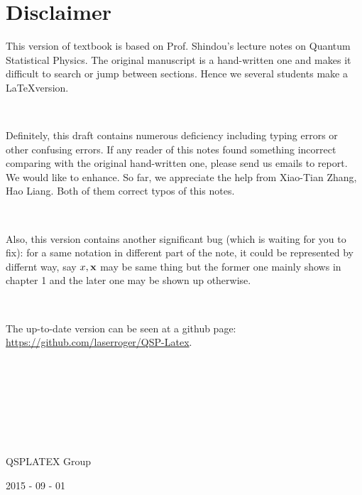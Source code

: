 
\chapter*{Disclaimer}

This version of textbook is based on Prof. Shindou's lecture notes on Quantum Statistical Physics. The original manuscript is a hand-written one and makes it difficult to search or jump between sections. Hence we several students make a \LaTeX version. 

\ 

Definitely, this draft contains numerous deficiency including typing errors or other confusing errors. If any reader of this notes found something incorrect comparing with the original hand-written one, please send us emails to report. We would like to enhance. So far, we appreciate the help from Xiao-Tian Zhang, Hao Liang. Both of them correct typos of this notes. 

\ 

Also, this version contains another significant bug (which is waiting for you to fix): for a same notation in different part of the note, it could be represented by differnt way, say $x, \bf{x}$ may be same thing but the former one mainly shows in chapter 1 and the later one may be shown up otherwise. 

\ 

The up-to-date version can be seen at a github page: \url{https://github.com/laserroger/QSP-Latex}. 


\ 

\ 

\ 

\ 

QSPLATEX Group

2015 - 09 - 01

